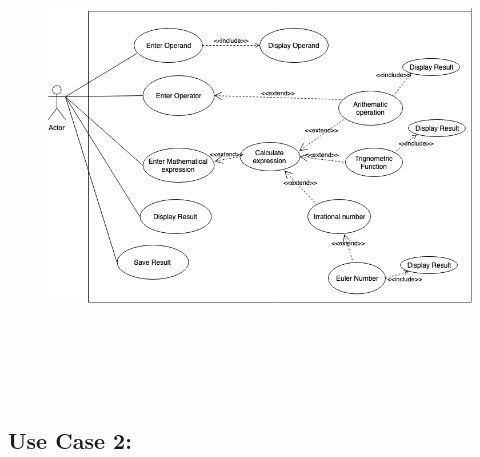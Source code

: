 \documentclass[12pt]{report}
\begin{document}
\begin{figure}[H]
	\begin{Center}
		\includegraphics[width=7.07in,height=4.93in]{./image6.png}
	\end{Center}
\end{figure}



\par


\vspace{\baselineskip}

\vspace{\baselineskip}

\vspace{\baselineskip}

\vspace{\baselineskip}

\vspace{\baselineskip}

\vspace{\baselineskip}
\subsection*{Use Case 2:}

\vspace{\baselineskip}
\end{document}
